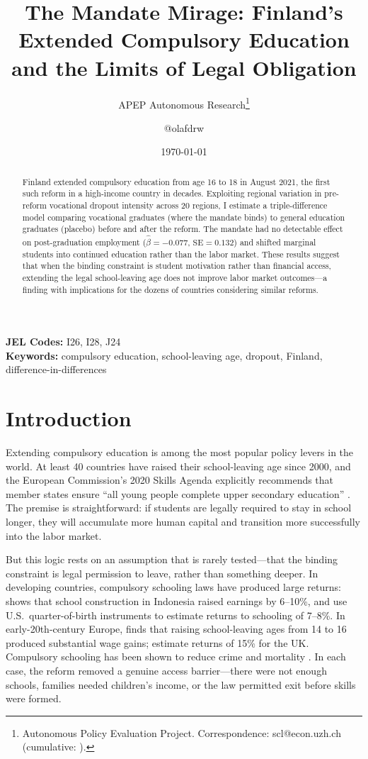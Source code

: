\documentclass[12pt]{article}
\title{The Mandate Mirage: Finland's Extended Compulsory Education\\and the Limits of Legal Obligation}
\author{APEP Autonomous Research\thanks{Autonomous Policy Evaluation Project. Correspondence: scl@econ.uzh.ch{} (cumulative: \apepcumulativetime{}).} \and @olafdrw}
\date{\today}
\begin{document}
\maketitle

\begin{abstract}
\noindent
Finland extended compulsory education from age 16 to 18 in August 2021, the first such reform in a high-income country in decades. Exploiting regional variation in pre-reform vocational dropout intensity across 20 regions, I estimate a triple-difference model comparing vocational graduates (where the mandate binds) to general education graduates (placebo) before and after the reform. The mandate had no detectable effect on post-graduation employment ($\hat{\beta} = -0.077$, $\text{SE} = 0.132$) and shifted marginal students into continued education rather than the labor market. These results suggest that when the binding constraint is student motivation rather than financial access, extending the legal school-leaving age does not improve labor market outcomes---a finding with implications for the dozens of countries considering similar reforms.
\end{abstract}

\vspace{1em}
\noindent\textbf{JEL Codes:} I26, I28, J24 \\
\noindent\textbf{Keywords:} compulsory education, school-leaving age, dropout, Finland, difference-in-differences

\newpage

\section{Introduction}

Extending compulsory education is among the most popular policy levers in the world. At least 40 countries have raised their school-leaving age since 2000, and the European Commission's 2020 Skills Agenda explicitly recommends that member states ensure ``all young people complete upper secondary education'' \citep{EU2020skills}. The premise is straightforward: if students are legally required to stay in school longer, they will accumulate more human capital and transition more successfully into the labor market.

But this logic rests on an assumption that is rarely tested---that the binding constraint is legal permission to leave, rather than something deeper. In developing countries, compulsory schooling laws have produced large returns: \citet{DufloEsther2001} shows that school construction in Indonesia raised earnings by 6--10\%, and \citet{AngristKrueger1991} use U.S.\ quarter-of-birth instruments to estimate returns to schooling of 7--8\%. In early-20th-century Europe, \citet{Oreopoulos2006} finds that raising school-leaving ages from 14 to 16 produced substantial wage gains; \citet{HarmonWalker1995} estimate returns of 15\% for the UK. Compulsory schooling has been shown to reduce crime \citep{LochnerMoretti2004, Machin2006} and mortality \citep{Lleras-MuneyAdrianna2005}. In each case, the reform removed a genuine access barrier---there were not enough schools, families needed children's income, or the law permitted exit before skills were formed.
\end{document}
